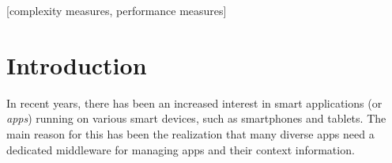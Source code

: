 \documentclass{sig-alternate}
\begin{document}
[complexity measures, performance measures]


%
\section{Introduction}
In recent years, there has been an increased interest in smart applications (or \textit{apps}) running on various smart devices, such as smartphones and tablets. 
The main reason for this has been the realization that many diverse apps need a dedicated middleware for managing apps and their context information. 
%
\end{document}
